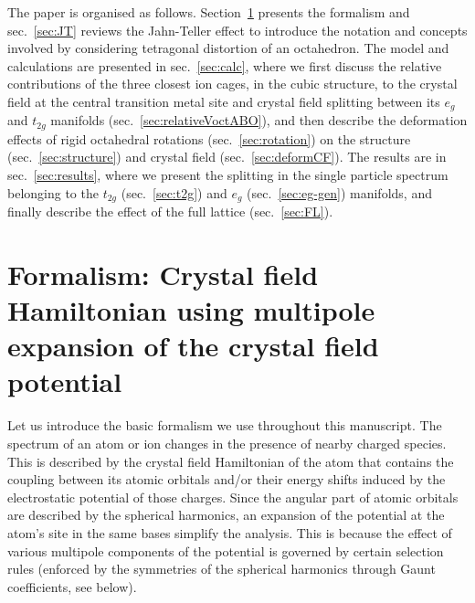 \documentclass[a4paper,prb,twocolumn]{revtex4-1}  %
\newcommand{\az}[1]{{\color{magenta}{#1}}} %
\begin{document}
The paper is organised as follows.
Section~\ref{sec:formalistm}
presents the formalism and 
sec.~\ref{sec:JT} reviews the Jahn-Teller effect to
introduce the notation and concepts involved
by considering tetragonal distortion of an octahedron.
The model and calculations are presented
in sec.~\ref{sec:calc},
where
we first discuss the relative contributions of the three closest ion cages,
in the cubic structure, to
the crystal field at the central transition metal site 
and crystal field splitting between its $e_g$ and $t_{2g}$ manifolds
(sec.~\ref{sec:relativeVoctABO}),
and then 
describe the deformation effects of 
rigid octahedral rotations (sec.~\ref{sec:rotation})
on
the structure (sec.~\ref{sec:structure}) 
and crystal field (sec.~\ref{sec:deformCF}).
The results are in sec.~\ref{sec:results},
where we %
present the splitting in the single particle spectrum
belonging to the $t_{2g}$ (sec.~\ref{sec:t2g})
and $e_g$ (sec.~\ref{sec:eg-gen}) manifolds,
and finally describe the effect of the full lattice (sec.~\ref{sec:FL}).
\az{appendix?}



 
\section{Formalism: Crystal field Hamiltonian using multipole expansion of the crystal field potential}
\label{sec:formalistm}

Let us introduce the basic formalism we use throughout this manuscript.
The spectrum of an atom or ion
changes in the presence of nearby charged species.
This is described by the crystal field Hamiltonian of the atom
that contains the coupling between its atomic orbitals and/or their energy shifts
induced by the electrostatic potential of those charges.
Since the angular part of atomic orbitals are described by 
the spherical harmonics,
an expansion of the potential at the atom's site 
in the same bases simplify the analysis.
This is because
the effect of various multipole components of the potential
is governed by certain selection rules 
(enforced by the symmetries of the spherical harmonics
through Gaunt coefficients, see below).
\end{document}
